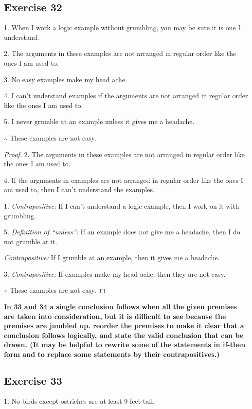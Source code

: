 \documentclass[14pt]{extarticle}
\begin{document}
\subsection{Exercise 32}
1. When I work a logic example without grumbling, you may be sure it is one I understand.

2. The arguments in these examples are not arranged in regular order like the ones I am used to.

3. No easy examples make my head ache.

4. I can’t understand examples if the arguments are not arranged in regular order like the ones I am used to.

5. I never grumble at an example unless it gives me a headache.

$\therefore$ These examples are not easy.

\begin{proof}
2. The arguments in these examples are not arranged in regular order like the ones I am used to.

4. If the arguments in examples are not arranged in regular order like the ones I am used to, then I can’t understand the examples.

1. {\it Contrapositive:} If I can't understand a logic example, then I work on it with grumbling.

5. {\it Definition of ``unless'':} If an example does not give me a headache, then I do not grumble at it.

{\it Contrapositive:} If I grumble at an example, then it gives me a headache.

3. {\it Contrapositive:} If examples make my head ache, then they are not easy.

$\therefore$ These examples are not easy.
\end{proof}

{\bf \color{cyan} In 33 and 34 a single conclusion follows when all the given premises are taken into consideration, but it is difficult to see because the premises are jumbled up. reorder the premises to make it clear that a conclusion follows logically, and state the valid conclusion that can be drawn. (It may be helpful to rewrite some of the statements in if-then form and to replace some statements by their contrapositives.)}

\subsection{Exercise 33}
1. No birds except ostriches are at least 9 feet tall.
\end{document}
